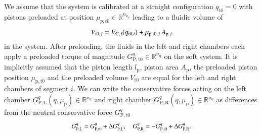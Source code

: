 We assume that the system is calibrated at a straight configuration $q_{\mathrm{t}0} = 0$ with pistons preloaded at position $\mu_{p,t0} \in \mathbb{R}^{n_{\mu_\mathrm{p}}}$ leading to a fluidic volume of
 \begin{equation}\small
     V_{\mathrm{t}0,j} = V_{\mathrm{C},j}(q_{\mathrm{t}0,i}) + \mu_{\mathrm{p},\mathrm{t}0,j} \, A_{\mathrm{p},j}
 \end{equation}
in the system. After preloading, the fluids in the left and right chambers each apply a preloaded torque of magnitude $G_{\mathrm{P},\mathrm{t}0}^{q} \in \mathbb{R}^{n_\mathrm{q}}$ on the soft system.
It is implicitly assumed that the piston length $l_\mathrm{p}$, piston area $A_\mathrm{p}$, the preloaded piston position $\mu_{\mathrm{p},\mathrm{t}0}$ and the preloaded volume $V_{\mathrm{t}0}$ are equal for the left and right chambers of segment $i$.
We can write the conservative forces acting on the left chamber $G_{\mathrm{P},\mathrm{L}}^q(q, \mu_\mathrm{p}) \in \mathbb{R}^{n_\mathrm{q}}$ and right chamber $G_{\mathrm{P},\mathrm{R}}^q(q, \mu_\mathrm{p}) \in \mathbb{R}^{n_\mathrm{q}}$ as differences from the neutral conservative force $G_{\mathrm{P},\mathrm{t}0}^{q}$
\begin{equation}\small
\begin{split}
    G_{\mathrm{P},\mathrm{L}}^q = G_{\mathrm{P},\mathrm{t}0}^{q} + \Delta G_{\mathrm{P},\mathrm{L}}^q,
    \quad
    G_{\mathrm{P},\mathrm{R}}^q = - G_{\mathrm{P},\mathrm{t}0}^{q} + \Delta G_{\mathrm{P},\mathrm{R}}^q.
\end{split}
\end{equation}
